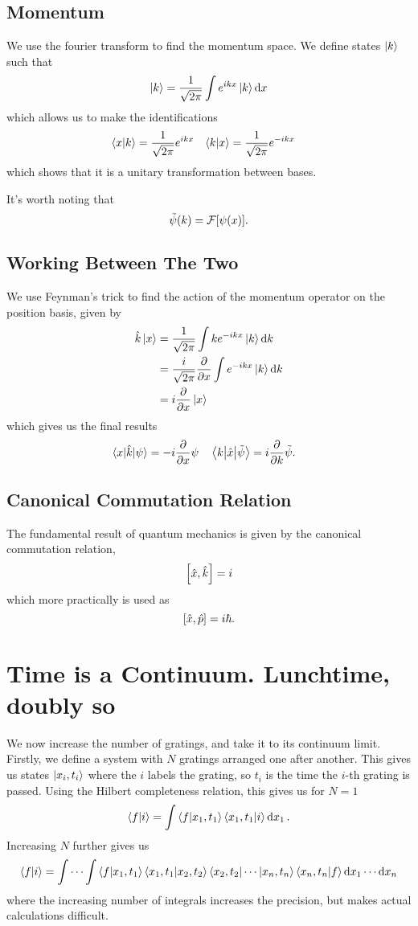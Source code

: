 \documentclass[]{revision-notes}
\begin{document}
\subsection{Momentum}
We use the fourier transform to find the momentum space.
We define states \(\ket{k}\) such that \[ \ket{k} = \frac{1}{\sqrt{2\pi}} \int e^{ikx} \ket{k} \dd{x}\] which allows us to make the identifications
\begin{align*}
  \braket{x}{k} &= \frac{1}{\sqrt{2\pi}}e^{ikx} & \braket{k}{x} &= \frac{1}{\sqrt{2\pi}}e^{-ikx}
\end{align*}
which shows that it is a unitary transformation between bases.

It's worth noting that \[ \tilde\psi(k) = \mathcal{F}\qty[\psi(x)].\]

\subsection{Working Between The Two}
We use Feynman's trick to find the action of the momentum operator on the position basis, given by
\begin{align*}
  \hat{k} \ket{x} &= \frac{1}{\sqrt{2\pi}} \int k e^{-ikx} \ket{k} \dd{k}\\
  &= \frac{i}{\sqrt{2\pi}} \pdv{x} \int e^{-ikx} \ket{k} \dd{k}\\
  &= i \pdv{x} \ket{x}
\end{align*}
which gives us the final results
\begin{align*}
  \mel{x}{\hat{k}}{\psi} &= -i\pdv{x} \psi & \mel{k}{\hat{x}}{\tilde\psi} &= i\pdv{k}\tilde\psi.
\end{align*}

\subsection{Canonical Commutation Relation}
The fundamental result of quantum mechanics is given by the canonical commutation relation, \[ \commutator{\hat{x}}{\hat{k}} = i \] which more practically is used as \[\commutator{\hat{x}}{\hat{p}} = i\hbar. \]

\section{Time is a Continuum. Lunchtime, doubly so}
We now increase the number of gratings, and take it to its continuum limit.
Firstly, we define a system with \(N\) gratings arranged one after another.
This gives us states \( \ket{x_i, t_i} \) where the \(i\) labels the grating, so \(t_i\) is the time the \(i\)-th grating is passed.
Using the Hilbert completeness relation, this gives us for \(N=1\) \[\braket{f}{i} = \int \braket{f}{x_1,t_1} \braket{x_1,t_1}{i}\dd{x_1}.\]
Increasing \(N\) further gives us \[\braket{f}{i} = \idotsint \braket{f}{x_1,t_1} \braket{x_1,t_1}{x_2,t_2} \bra{x_2, t_2}\cdots\ket{x_n,t_n}\braket{x_n, t_n}{f}\dd{x_1}\cdots\dd{x_n}\] where the increasing number of integrals increases the precision, but makes actual calculations difficult.
\end{document}
